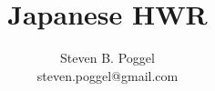 
\title{Japanese HWR}
\author{Steven B. Poggel\\
steven.poggel@gmail.com}

%

\maketitle




%

%

\thispagestyle{empty}
\tableofcontents



%



%

%

\fontsize{11pt}{13}
\selectfont

\pagestyle{headings}


